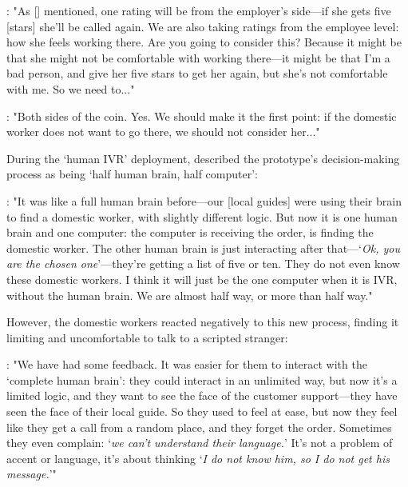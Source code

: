 \begin{displayquote}
\textbf{\NGOOne{}}: "As [\PCTwo{}] mentioned, one rating will be from the employer’s side---if she gets five [stars] she’ll be called again. We are also taking ratings from the employee level: how she feels working there. Are you going to consider this? Because it might be that she might not be comfortable with working there---it might be that I’m a bad person, and give her five stars to get her again, but she’s not comfortable with me. So we need to..."

\textbf{\PCTwo{}}: "Both sides of the coin. Yes. We should make it the first point: if the domestic worker does not want to go there, we should not consider her..."
\end{displayquote}

During the `human IVR' deployment, \PCTwo{} described the prototype's decision-making process as being `half human brain, half computer':

\begin{displayquote}
\textbf{\PCTwo{}}: "It was like a full human brain before---our [local guides] were using their brain to find a domestic worker, with slightly different logic. But now it is one human brain and one computer: the computer is receiving the order, is finding the domestic worker. The other human brain is just interacting after that---‘\textit{Ok, you are the chosen one}’---they’re getting a list of five or ten. They do not even know these domestic workers. I think it will just be the one computer when it is IVR, without the human brain. We are almost half way, or more than half way."
\end{displayquote}

However, the domestic workers reacted negatively to this new process, finding it limiting and uncomfortable to talk to a scripted stranger:

\begin{displayquote}
\textbf{\PCTwo{}}: "We have had some feedback. It was easier for them to interact with the `complete human brain’: they could interact in an unlimited way, but now it’s a limited logic, and they want to see the face of the customer support---they have seen the face of their local guide. So they used to feel at ease, but now they feel like they get a call from a random place, and they forget the order. Sometimes they even complain: ‘\textit{we can’t understand their language.}' It's not a problem of accent or language, it’s about thinking ‘\textit{I do not know him, so I do not get his message.}’"
\end{displayquote}


